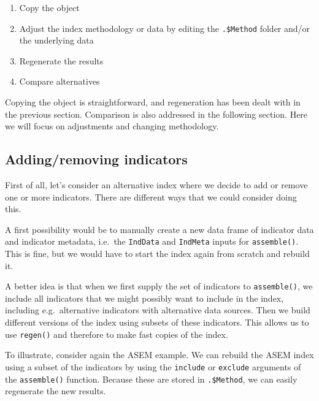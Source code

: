 \documentclass[
]{book}
\providecommand{\tightlist}{%
  \setlength{\itemsep}{0pt}\setlength{\parskip}{0pt}}
\begin{document}
\begin{enumerate}
\def\labelenumi{\arabic{enumi}.}
\tightlist
\item
  Copy the object
\item
  Adjust the index methodology or data by editing the \texttt{.\$Method} folder and/or the underlying data
\item
  Regenerate the results
\item
  Compare alternatives
\end{enumerate}

Copying the object is straightforward, and regeneration has been dealt with in the previous section. Comparison is also addressed in the following section. Here we will focus on adjustments and changing methodology.

\hypertarget{addingremoving-indicators}{%
\subsection{Adding/removing indicators}\label{addingremoving-indicators}}

First of all, let's consider an alternative index where we decide to add or remove one or more indicators. There are different ways that we could consider doing this.

A first possibility would be to manually create a new data frame of indicator data and indicator metadata, i.e.~the \texttt{IndData} and \texttt{IndMeta} inputs for \texttt{assemble()}. This is fine, but we would have to start the index again from scratch and rebuild it.

A better idea is that when we first supply the set of indicators to \texttt{assemble()}, we include all indicators that we might possibly want to include in the index, including e.g.~alternative indicators with alternative data sources. Then we build different versions of the index using subsets of these indicators. This allows us to use \texttt{regen()} and therefore to make fast copies of the index.

To illustrate, consider again the ASEM example. We can rebuild the ASEM index using a subset of the indicators by using the \texttt{include} or \texttt{exclude} arguments of the \texttt{assemble()} function. Because these are stored in \texttt{.\$Method}, we can easily regenerate the new results.
\end{document}
